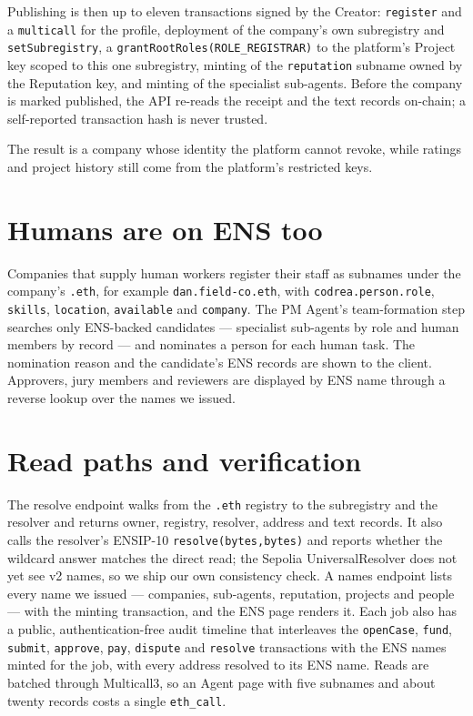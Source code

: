 \documentclass[11pt,a4paper]{article}
\newcommand{\code}[1]{\texttt{#1}}
\begin{document}
Publishing is then up to eleven transactions signed by the Creator: \code{register} and a \code{multicall} for the profile, deployment of the company's own subregistry and \code{setSubregistry}, a \code{grantRootRoles(ROLE\_REGISTRAR)} to the platform's Project key scoped to this one subregistry, minting of the \code{reputation} subname owned by the Reputation key, and minting of the specialist sub-agents. Before the company is marked published, the API re-reads the receipt and the text records on-chain; a self-reported transaction hash is never trusted.

The result is a company whose identity the platform cannot revoke, while ratings and project history still come from the platform's restricted keys.

\section{Humans are on ENS too}

Companies that supply human workers register their staff as subnames under the company's \code{.eth}, for example \code{dan.field-co.eth}, with \code{codrea.person.role}, \code{skills}, \code{location}, \code{available} and \code{company}. The PM Agent's team-formation step searches only ENS-backed candidates --- specialist sub-agents by role and human members by record --- and nominates a person for each human task. The nomination reason and the candidate's ENS records are shown to the client. Approvers, jury members and reviewers are displayed by ENS name through a reverse lookup over the names we issued.

\section{Read paths and verification}

The resolve endpoint walks from the \code{.eth} registry to the subregistry and the resolver and returns owner, registry, resolver, address and text records. It also calls the resolver's ENSIP-10 \code{resolve(bytes,bytes)} and reports whether the wildcard answer matches the direct read; the Sepolia UniversalResolver does not yet see v2 names, so we ship our own consistency check. A names endpoint lists every name we issued --- companies, sub-agents, reputation, projects and people --- with the minting transaction, and the ENS page renders it. Each job also has a public, authentication-free audit timeline that interleaves the \code{openCase}, \code{fund}, \code{submit}, \code{approve}, \code{pay}, \code{dispute} and \code{resolve} transactions with the ENS names minted for the job, with every address resolved to its ENS name. Reads are batched through Multicall3, so an Agent page with five subnames and about twenty records costs a single \code{eth\_call}.
\end{document}
